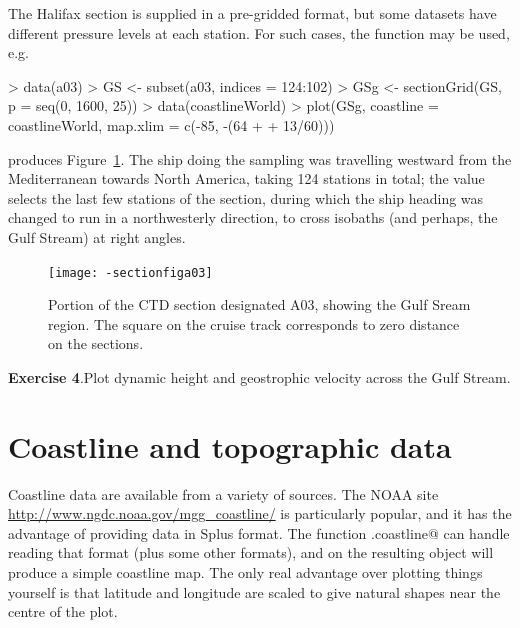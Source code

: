 \documentclass{article}
\newcommand{\workedexercise}[2]{
	\vspace{2ex plus 2ex minus 1ex}
	\begin{boxedminipage}[c]{0.95\linewidth}
		{\textbf{Exercise #1}.\hspace{1em}#2}
	\end{boxedminipage}
	\vspace{2ex plus 2ex minus 1ex}
}
\begin{document}

The Halifax section is supplied in a pre-gridded format, but some datasets have
different pressure levels at each station.  For such cases, the
\verb@sectionGrid@ function may be used, e.g.
\begin{Schunk}
\begin{Sinput}
> data(a03)
> GS <- subset(a03, indices = 124:102)
> GSg <- sectionGrid(GS, p = seq(0, 1600, 25))
> data(coastlineWorld)
> plot(GSg, coastline = coastlineWorld, map.xlim = c(-85, -(64 + 
+     13/60)))
\end{Sinput}
\end{Schunk}
produces Figure~\ref{fig:sectiona03}.  The ship doing the sampling was
travelling westward from the Mediterranean towards North America, taking 124
stations in total; the \verb@indices@ value selects the last few
stations of the section, during which the ship heading was changed to run in a
northwesterly direction, to cross isobaths (and perhaps, the Gulf Stream) at
right angles.

\begin{figure}
\begin{center}
\texttt{[image: -sectionfiga03]}
\end{center}
\caption{\label{fig:sectiona03}
  Portion of the CTD section designated A03, showing the Gulf Sream region.  The
  square on the cruise track corresponds to zero distance on the sections.
}
\end{figure}

\workedexercise{4}{Plot dynamic height and geostrophic velocity across the Gulf Stream.}

\section{Coastline and topographic data}


Coastline data are available from a variety of sources. The NOAA site
\url{http://www.ngdc.noaa.gov/mgg_coastline/} is particularly popular, and it
has the advantage of providing data in Splus format.  The function
\verb@read.coastline@ can handle reading that format (plus some other formats),
and \verb@plot@ on the resulting object will produce a simple coastline map.
The only real advantage over plotting things yourself is that latitude and
longitude are scaled to give natural shapes near the centre of the plot.
\end{document}

